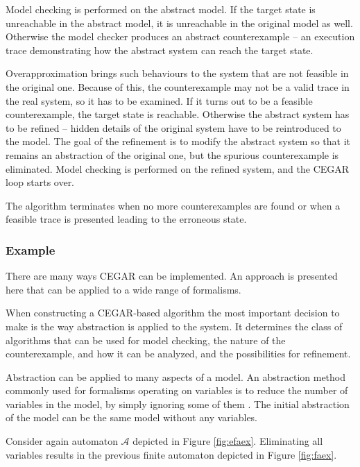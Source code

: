 Model checking is performed on the abstract model. If the target state is
unreachable in the abstract model, it is unreachable in the original model
as well. Otherwise the model checker produces an abstract counterexample -- an execution trace demonstrating how the abstract
system can reach the target state. 

Overapproximation brings such behaviours to the system that are not feasible in the original one. Because of this, the counterexample may not be a valid trace in the real system, so it has to be examined.
If it turns out to be a feasible counterexample, the target state is reachable. Otherwise
the abstract system has to be refined -- hidden details of the original system have to be reintroduced to the model. The goal of the refinement is to modify the abstract
system so that it remains an abstraction of the original one, but the spurious
counterexample is eliminated.  Model checking is performed on the
refined system, and the CEGAR loop starts over. 

The algorithm terminates when no more
counterexamples are found or when a feasible trace is
presented leading to the erroneous state.

\subsubsection{Example} \label{sec:cegarex}

There are many ways CEGAR can be implemented. An approach is presented here that can be applied to a wide range of formalisms.

When constructing a CEGAR-based algorithm the most important decision to make is the way abstraction is applied to the system. It determines the class of algorithms that can be used for model checking, the nature of the counterexample, and how it can be analyzed, and the possibilities for refinement. 

 Abstraction can be applied to many aspects of a model. An abstraction method commonly used for formalisms operating on variables is to reduce the number of variables in the model, by simply ignoring some of them \cite{Clarke:1994:MCA}. The initial abstraction of the model can be the same model without any variables.
 
 \begin{example}
 	Consider again automaton $\mathcal{A}$ depicted in Figure \ref{fig:efaex}. Eliminating all variables results in the previous finite automaton depicted in Figure \ref{fig:faex}.
 \end{example}

